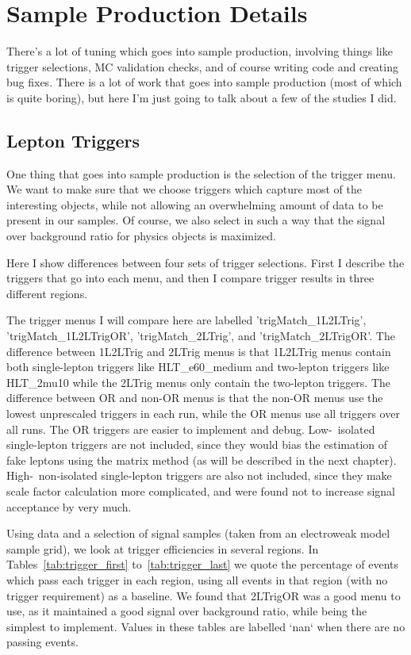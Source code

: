\chapter{Sample Production Details}

There's a lot of tuning which goes into sample production, involving things like trigger selections, MC validation checks, and of course writing code and creating bug fixes. There is a lot of work that goes into sample production (most of which is quite boring), but here I'm just going to talk about a few of the studies I did.

\section{Lepton Triggers}

One thing that goes into sample production is the selection of the trigger menu. We want to make sure that we choose triggers which capture most of the interesting objects, while not allowing an overwhelming amount of data to be present in our samples. Of course, we also select in such a way that the signal over background ratio for physics objects is maximized.

Here I show differences between four sets of trigger selections. First I describe the triggers that go into each menu, and then I compare trigger results in three different regions.

The trigger menus I will compare here are labelled 'trigMatch\_1L2LTrig', 'trigMatch\_1L2LTrigOR', 'trigMatch\_2LTrig', and 'trigMatch\_2LTrigOR'. The difference between 1L2LTrig and 2LTrig menus is that 1L2LTrig menus contain both single-lepton triggers like HLT\_e60\_medium and two-lepton triggers like HLT\_2mu10 while the 2LTrig menus only contain the two-lepton triggers. The difference between OR and non-OR menus is that the non-OR menus use the lowest unprescaled triggers in each run, while the OR menus use all triggers over all runs. The OR triggers are easier to implement and debug. Low-\pt\ isolated single-lepton triggers are not included, since they would bias the estimation of fake leptons using the matrix method (as will be described in the next chapter). High-\pt\ non-isolated single-lepton triggers are also not included, since they make scale factor calculation more complicated, and were found not to increase signal acceptance by very much.

Using data and a selection of signal samples (taken from an electroweak model sample grid), we look at trigger efficiencies in several regions. In Tables~\ref{tab:trigger_first} to~\ref{tab:trigger_last} we quote the percentage of events which pass each trigger in each region, using all events in that region (with no trigger requirement) as a baseline. We found that 2LTrigOR was a good menu to use, as it maintained a good signal over background ratio, while being the simplest to implement. Values in these tables are labelled `nan` when there are no passing events.


